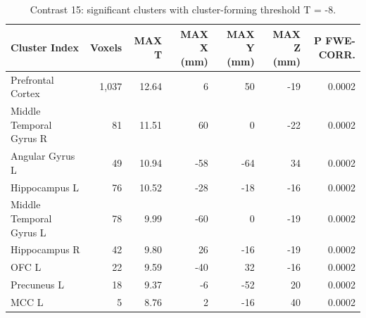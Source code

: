 \begin{table}[htbp]
    \centering
    \begin{threeparttable}
    \caption{Contrast 15: significant clusters with cluster-forming threshold T = -8.}
    \begin{tabularx}{\textwidth}{l *{6}{R}}
        \toprule
        \textbf{Cluster Index} & \textbf{Voxels} & \textbf{MAX T} & \textbf{MAX X (mm)} & \textbf{MAX Y (mm}) & \textbf{MAX Z (mm)} & \textbf{P FWE-CORR.} \\
        \midrule
        Prefrontal Cortex & 1,037 & 12.64 & 6 & 50 & -19 & 0.0002 \\
Middle Temporal Gyrus R & 81 & 11.51 & 60 & 0 & -22 & 0.0002 \\
Angular Gyrus L & 49 & 10.94 & -58 & -64 & 34 & 0.0002 \\
Hippocampus L & 76 & 10.52 & -28 & -18 & -16 & 0.0002 \\
Middle Temporal Gyrus L & 78 & 9.99 & -60 & 0 & -19 & 0.0002 \\
Hippocampus R & 42 & 9.80 & 26 & -16 & -19 & 0.0002 \\
OFC L & 22 & 9.59 & -40 & 32 & -16 & 0.0002 \\
Precuneus L & 18 & 9.37 & -6 & -52 & 20 & 0.0002 \\
MCC L & 5 & 8.76 & 2 & -16 & 40 & 0.0002 \\
        \bottomrule
        \end{tabularx}
        \end{threeparttable}
        \label{tab:con15_neg}%
\end{table}%